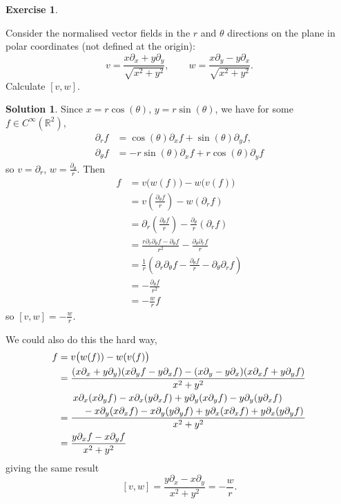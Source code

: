 \documentclass[11pt, a4paper]{report}
\theoremstyle{definition}
\newtheorem{ex}{Exercise}[part]
\newtheorem{sol}{Solution}[part]
\begin{document}
\begin{ex}\label{ex:liebracketpolarcoordinates}

Consider the normalised vector fields in the $r$ and $\theta$ directions on the plane in polar coordinates (not defined at the origin):
\[
    v = \frac{x \partial_x + y \partial_y}{\sqrt{x^2 + y^2}}, \qquad
    w = \frac{x \partial_y - y \partial_x}{\sqrt{x^2 + y^2}}.
\]
Calculate $[v, w]$.

\end{ex}

\begin{sol}

Since $x = r \cos(\theta)$, $y = r \sin(\theta)$, we have for some $f \in C^\infty(\mathbb{R}^2)$,
\begin{align*}
    \partial_r f &=\cos(\theta) \partial_x f + \sin(\theta) \partial_y f, \\
    \partial_\theta f &= -r \sin(\theta) \partial_x f + r \cos(\theta) \partial_y f
\end{align*}
so $v = \partial_r$, $w = \frac{\partial_\theta}{r}$.
Then
\allowdisplaybreaks[3]
\begin{align*}
    [v, w]f &= v \bigl( w(f)) - w(v(f) \bigr) \\
        &= v\left(\frac{\partial_\theta f}{r}\right) - w(\partial_r f) \\
        &= \partial_r\left(\frac{\partial_\theta f}{r}\right)
            - \frac{\partial_\theta}{r}(\partial_r f) \\
        &= \frac{r \partial_r \partial_\theta f - \partial_\theta f}{r^2}
            - \frac{\partial_\theta \partial_r f}{r} \\
        &= \frac{1}{r} \left(\partial_r \partial_\theta f - \frac{\partial_\theta f}{r}
            - \partial_\theta \partial_r f\right) \\
        &= -\frac{\partial_\theta f}{r^2} \\
        &= -\frac{w}{r} f
\end{align*}
so $[v, w] = -\frac{w}{r}$.
\allowdisplaybreaks[2]

We could also do this the hard way,
\begin{align*}
    [v, w]f &= v \bigl( w(f)) - w(v(f) \bigr) \\
        &= \frac{(x \partial_x + y \partial_y)(x \partial_y f - y \partial_x f) - (x \partial_y - y \partial_x)(x \partial_x f + y \partial_y f)}{x^2 + y^2} \\
        &= \frac{\splitdfrac{x \partial_x (x\partial_y f)
                             - x\partial_x(y \partial_x f)
                             + y \partial_y(x\partial_y f)
                             - y \partial_y(y \partial_x f)}
                            {{}-x\partial_y(x\partial_x f)
                             - x\partial_y(y\partial_y f)
                             + y\partial_x(x \partial_x f)
                             + y\partial_x (y \partial_y f)}
                }{x^2 + y^2} \\
        &= \frac{y \partial_x f - x \partial_y f}{x^2 + y^2}
\end{align*}
giving the same result
\[
    [v, w] = \frac{y \partial_x - x \partial_y}{x^2 + y^2} = -\frac{w}{r}.
\]


\end{sol}
\end{document}
